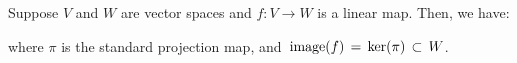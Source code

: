 
\vskip 0.5cm
\begin{remark}
\mbox{}
\vskip 0.15cm
\noindent
Suppose $V$ and $W$ are vector spaces and $f : V \longrightarrow W$ is a linear map.
Then, we have:
\begin{center}
\end{center}
where $\pi$ is the standard projection map, and
\,$\textnormal{image}(f) \,=\, \ker(\pi) \,\subset\, W$.
\end{remark}


